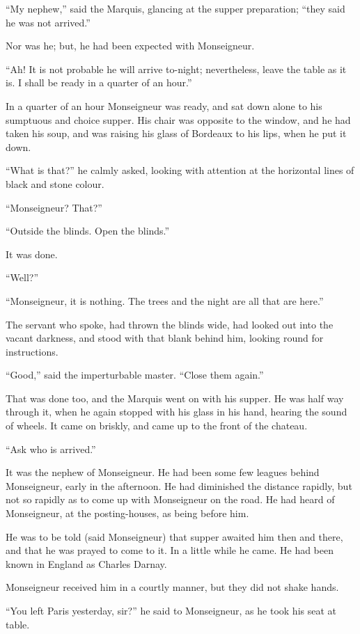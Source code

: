 ``My nephew,'' said the Marquis, glancing at the supper preparation;
``they said he was not arrived.''

Nor was he; but, he had been expected with Monseigneur.

``Ah!  It is not probable he will arrive to-night; nevertheless, leave
the table as it is.  I shall be ready in a quarter of an hour.''

In a quarter of an hour Monseigneur was ready, and sat down alone
to his sumptuous and choice supper. His chair was opposite to the
window, and he had taken his soup, and was raising his glass of
Bordeaux to his lips, when he put it down.

``What is that?'' he calmly asked, looking with attention at the
horizontal lines of black and stone colour.

``Monseigneur?  That?''

``Outside the blinds.  Open the blinds.''

It was done.

``Well?''

``Monseigneur, it is nothing.  The trees and the night are all that
are here.''

The servant who spoke, had thrown the blinds wide, had looked out
into the vacant darkness, and stood with that blank behind him,
looking round for instructions.

``Good,'' said the imperturbable master.  ``Close them again.''

That was done too, and the Marquis went on with his supper.  He was
half way through it, when he again stopped with his glass in his
hand, hearing the sound of wheels.  It came on briskly, and came up
to the front of the chateau.

``Ask who is arrived.''

It was the nephew of Monseigneur.  He had been some few leagues
behind Monseigneur, early in the afternoon.  He had diminished the
distance rapidly, but not so rapidly as to come up with Monseigneur
on the road.  He had heard of Monseigneur, at the posting-houses,
as being before him.

He was to be told (said Monseigneur) that supper awaited him then and
there, and that he was prayed to come to it.  In a little while he came.
He had been known in England as Charles Darnay.

Monseigneur received him in a courtly manner, but they did not shake hands.

``You left Paris yesterday, sir?'' he said to Monseigneur, as he took
his seat at table.

